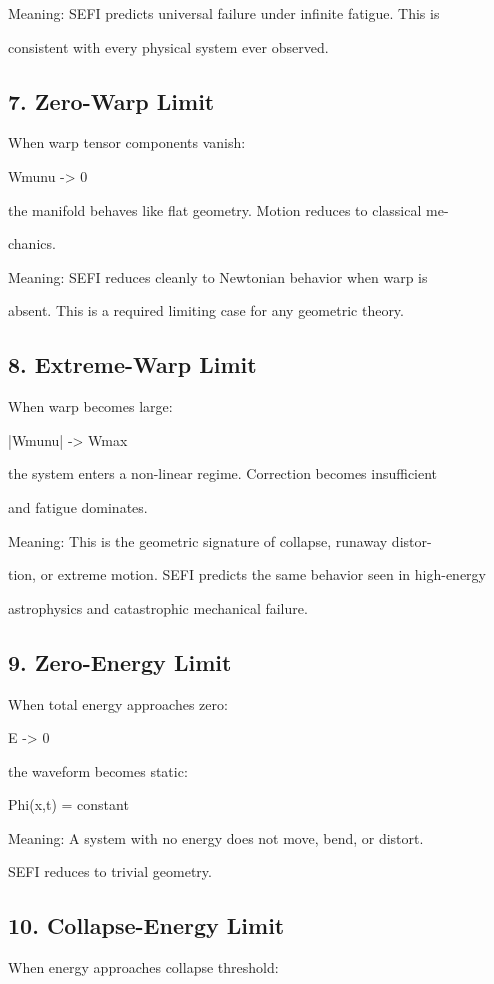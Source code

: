 \documentclass[10pt]{article}
\begin{document}
Meaning: SEFI predicts universal failure under infinite fatigue. This is

consistent with every physical system ever observed.

\subsection*{7. Zero-Warp Limit}
When warp tensor components vanish:

Wmunu -> 0

the manifold behaves like flat geometry. Motion reduces to classical me-

chanics.

Meaning: SEFI reduces cleanly to Newtonian behavior when warp is

absent. This is a required limiting case for any geometric theory.


\subsection*{8. Extreme-Warp Limit}
When warp becomes large:

|Wmunu| -> Wmax

the system enters a non-linear regime. Correction becomes insufficient

and fatigue dominates.

Meaning: This is the geometric signature of collapse, runaway distor-

tion, or extreme motion. SEFI predicts the same behavior seen in high-energy

astrophysics and catastrophic mechanical failure.

\subsection*{9. Zero-Energy Limit}
When total energy approaches zero:

E -> 0

the waveform becomes static:

Phi(x,t) = constant

Meaning: A system with no energy does not move, bend, or distort.

SEFI reduces to trivial geometry.

\subsection*{10. Collapse-Energy Limit}
When energy approaches collapse threshold:
\end{document}
